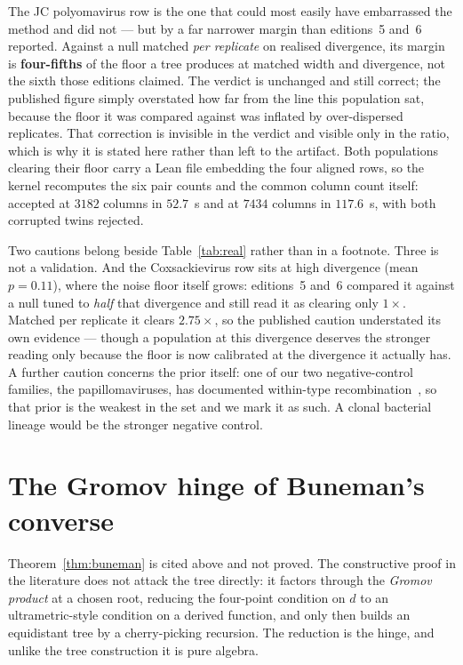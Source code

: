 \documentclass[11pt,a4paper]{article}
\theoremstyle{definition}
\theoremstyle{remark}
\begin{document}
The JC polyomavirus row is the one that could most easily have embarrassed the
method and did not --- but by a far narrower margin than editions~5 and~6
reported. Against a null matched
\emph{per replicate} on realised divergence, its margin is \textbf{four-fifths}
of the floor a tree produces at matched width and divergence, not the sixth those
editions claimed. The verdict is unchanged and still correct; the published
figure simply overstated how far from the line this population sat, because the
floor it was compared against was inflated by over-dispersed replicates. That
correction is invisible in the verdict and visible only in the ratio, which is
why it is stated here rather than left to the artifact.
Both populations clearing their floor carry a Lean file embedding the four
aligned rows, so the kernel recomputes the six pair counts and the common column
count itself: accepted at $3182$ columns in $52.7$~s and at $7434$ columns in
$117.6$~s, with both corrupted twins rejected.

Two cautions belong beside Table~\ref{tab:real} rather than in a footnote. Three
is not a validation. And the Coxsackievirus row sits at high divergence (mean
$p = 0.11$), where the noise floor itself grows: editions~5 and~6 compared it
against a null tuned to \emph{half} that divergence and still read it as clearing
only $1\times$. Matched per replicate it clears $2.75\times$, so the published
caution understated its own evidence --- though a population at this divergence
deserves the stronger reading only because the floor is now calibrated at the
divergence it actually has. A further caution concerns the prior itself:
one of our two negative-control families, the papillomaviruses, has documented
within-type recombination~\cite{murahwa}, so that prior is the weakest in the set
and we mark it as such. A clonal bacterial lineage would be the stronger negative
control.

\section{The Gromov hinge of Buneman's converse}\label{sec:gromov}

Theorem~\ref{thm:buneman} is cited above and not proved. The constructive proof
in the literature does not attack the tree directly: it factors through the
\emph{Gromov product} at a chosen root, reducing the four-point condition on $d$
to an ultrametric-style condition on a derived function, and only then builds an
equidistant tree by a cherry-picking recursion. The reduction is the hinge, and
unlike the tree construction it is pure algebra.
\end{document}
